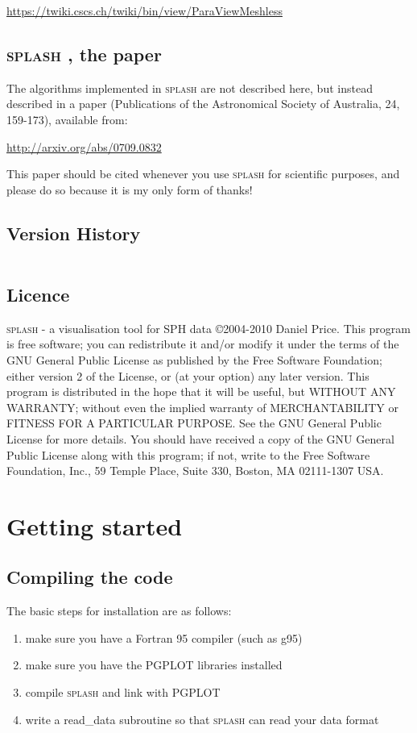 \documentclass[a4paper,10pt]{article}
\def\thisyear{2010 }
\newcommand{\splash}{\textsc{splash }}
\begin{document}
\url{https://twiki.cscs.ch/twiki/bin/view/ParaViewMeshless}

\subsection{\splash, the paper}
 The algorithms implemented in \splash are not described here, but instead described in a paper \citep{splashpaper} (Publications of the Astronomical Society of Australia, 24, 159-173), available from:

\url{http://arxiv.org/abs/0709.0832}

\noindent This paper should be cited whenever you use \splash for scientific purposes, and please do so because it is my only form of thanks!

\subsection{Version History}

\begin{longtable}{|l|l|p{}|}
\hline

\hline
\end{longtable}

\subsection{Licence}
\splash - a visualisation tool for SPH data \copyright 2004-\thisyear  Daniel Price.
 This program is free software; you can redistribute it and/or modify it under the terms of the GNU General Public License as published by the Free Software Foundation; either version 2 of the License, or (at your option) any later version. This program is distributed in the hope that it will be useful, but WITHOUT ANY WARRANTY; without even the implied warranty of MERCHANTABILITY or FITNESS FOR A PARTICULAR PURPOSE.  See the GNU General Public License for more details. You should have received a copy of the GNU General Public License along with this program; if not, write to the Free Software Foundation, Inc., 59 Temple Place, Suite 330, Boston, MA  02111-1307  USA.

\section{Getting started}
\subsection{Compiling the code}
The basic steps for installation are as follows:
\begin{enumerate}
\item make sure you have a Fortran 95 compiler (such as g95)
\item make sure you have the PGPLOT libraries installed
\item compile \splash and link with PGPLOT
\item write a read\_data subroutine so that \splash can read your data format
\end{enumerate}
\end{document}
